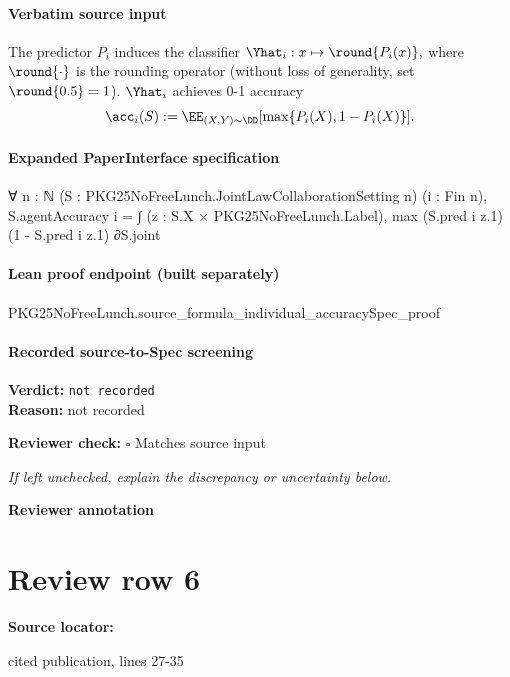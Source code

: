 \documentclass[10pt]{article}
\newcommand{\reviewerbox}{%
  \par\noindent\fbox{\parbox{0.96\linewidth}{\rule{0pt}{0.38in}}}\par
}
\newcommand{\reviewmatch}[1]{%
  \par\noindent\textbf{Reviewer check:} $\square$\; #1\par
  \noindent\emph{If left unchecked, explain the discrepancy or uncertainty below.}\par
}
\begin{document}
\paragraph{Verbatim source input}
\begin{ReviewVerbatim}
The predictor $P_i$ induces the classifier $\Yhat_i: x\mapsto \round{P_i(x)},$ where $\round{\cdot}$ is the rounding operator (without loss of generality, set $\round{0.5}=1$). $\Yhat_i$ achieves 0-1 accuracy
\begin{equation}
    \acc_i(S) := \EE_{(X,Y)\sim \DD}[\max\{P_i(X), 1 - P_i(X)\}].
\end{equation}
\end{ReviewVerbatim}


\paragraph{Expanded PaperInterface specification}
\begin{ReviewVerbatim}
∀ {n : ℕ} (S : PKG25NoFreeLunch.JointLawCollaborationSetting n) (i : Fin n),
  S.agentAccuracy i = ∫ (z : S.X × PKG25NoFreeLunch.Label), max (S.pred i z.1) (1 - S.pred i z.1) ∂S.joint
\end{ReviewVerbatim}

\paragraph{Lean proof endpoint (built separately)}\begin{ReviewVerbatim}
PKG25NoFreeLunch.source_formula_individual_accuracySpec_proof
\end{ReviewVerbatim}

\paragraph{Recorded source-to-Spec screening}
\textbf{Verdict:} \texttt{not recorded}
\\
\textbf{Reason:} not recorded
\reviewmatch{Matches source input}
\noindent\textbf{Reviewer annotation}\par
\reviewerbox
\clearpage
\hypertarget{source-claim-ca1c9f8cb9fbae0b}{}
\section*{Review row 6}
\textbf{Source locator:} {\footnotesize\raggedright cited publication, lines 27-\allowbreak{}35\par}
\end{document}
